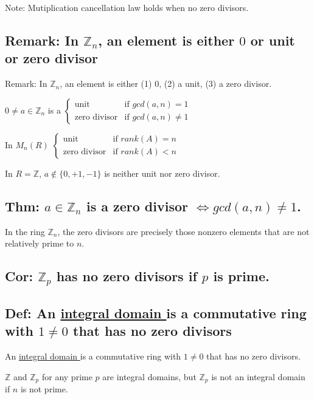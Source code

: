 \documentclass[11pt]{elegantbook}
\begin{document}
Note: Mutiplication cancellation law holds when no zero divisors.

\subsection{Remark: In $\mathbb{Z}_n$, an element is either $0$ or unit or zero divisor}
Remark: In $\mathbb{Z}_n$, an element is either (1) 0, (2) a unit, (3) a zero divisor.

$0\neq a\in \mathbb{Z}_n$ is a $\left\{\begin{matrix}
    \text{unit}&\text{if }gcd(a,n)=1\\
    \text{zero divisor}&\text{if }gcd(a,n)\neq 1
\end{matrix}\right.$

In $M_n(R)$ $\left\{\begin{matrix}
    \text{unit}&\text{if }rank(A)=n\\
    \text{zero divisor}&\text{if }rank(A)<n
\end{matrix}\right.$

In $R=\mathbb{Z}$, $a\notin\{0,+1,-1\}$ is neither unit nor zero divisor.
\subsection{Thm: $a\in\mathbb{Z}_n$ is a zero divisor $\Leftrightarrow gcd(a,n)\neq 1$.}
\begin{theorem}
    In the ring $\mathbb{Z}_n$, the zero divisors are precisely those nonzero elements that are not relatively prime to $n$.
\end{theorem}
\subsection{Cor: $\mathbb{Z}_p$ has no zero divisors if $p$ is prime.}

\subsection{Def: An \underline{integral domain
} is a commutative ring with $1\neq 0$ that has no zero divisors}
\begin{definition}
    An \underline{integral domain
    } is a commutative ring with $1\neq 0$ that has no zero divisors.
\end{definition}
$\mathbb{Z}$ and $\mathbb{Z}_p$ for any prime $p$ are integral domains, but $\mathbb{Z}_p$ is not an integral domain if $n$ is not prime.
\end{document}
